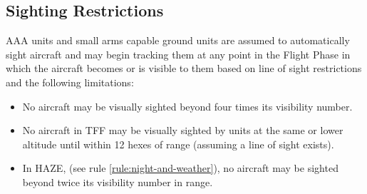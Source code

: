 \subsection{Sighting Restrictions} AAA units and small arms capable ground units are assumed to automatically sight aircraft and may begin tracking them at any point in the Flight Phase in which the aircraft becomes or is visible to them based on line of sight restrictions and the following limitations:

\begin{itemize}

    \item No aircraft may be visually sighted beyond four times its visibility number.

    \item No aircraft in TFF may be visually sighted by units at the same or lower altitude until within 12 hexes of range (assuming a line of sight exists).

    \item In HAZE, (see rule \ref{rule:night-and-weather}), no aircraft may be sighted beyond twice its visibility number in range.


\end{itemize}



